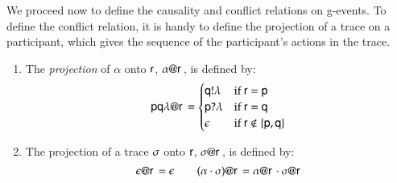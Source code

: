 \bigskip

 We proceed now to define the causality and conflict relations on
g-events. 
To define the conflict relation, %
 it is handy to define the projection of a  trace  on a participant, which 
gives the sequence of the participant's actions  in the trace.  

\begin{definition}[Projection]
\begin{enumerate}
\item The {\em projection} of $\alpha$ onto ${\sf r}$, %
$\alpha @ {\sf r}\,$, is defined by:
\[
{\sf p}{\sf q}\lambda @ {\sf r}\,=\begin{cases}
      {\sf q}!\lambda & \text{if }{\sf r}={\sf p}\\
      {\sf p}?\lambda & \text{if }{\sf r}={\sf q}\\
      \epsilon& \text{if }{\sf r}\not\in\{{\sf p},{\sf q}\}
  \end{cases}
  \]
\item The projection of a  trace  $\sigma$ onto ${\sf r}$, $\sigma @ {\sf r}\,$, is defined by:
\[
\epsilon @ {\sf r}\,=\epsilon\quad\quad
(\alpha\cdot\sigma) @ {\sf r}\,=\alpha @ {\sf r}\,\cdot\sigma @ {\sf r}\,
\]
\end{enumerate}
\end{definition}



